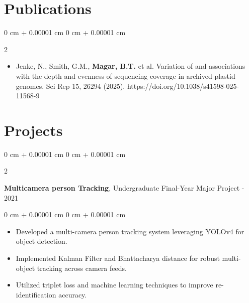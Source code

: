 \documentclass[10pt, letterpaper]{article}
\newenvironment{highlights}{
    \begin{itemize}[
        topsep=0.10 cm,
        parsep=0.10 cm,
        partopsep=0pt,
        itemsep=0.05cm,
        leftmargin=0 cm + 10pt
    ]
}{
    \end{itemize}
} %
\newenvironment{onecolentry}{
    \begin{adjustwidth}{
        0 cm + 0.00001 cm
    }{
        0 cm + 0.00001 cm
    }
}{
    \end{adjustwidth}
} %
\newenvironment{twocolentry}[2][]{
    \onecolentry
    \def\secondColumn{#2}
    \setcolumnwidth{\fill, 4.5 cm}
    \begin{paracol}{2}
}{
    \switchcolumn \raggedleft \secondColumn
    \end{paracol}
    \endonecolentry
} %
\begin{document}
\section{Publications}
\begin{twocolentry}
    {2025}
        \begin{highlights}
            \item Jenke, N., Smith, G.M., \textbf{Magar, B.T.} et al. Variation of and associations with the depth and evenness of sequencing coverage in archived plastid genomes. Sci Rep 15, 26294 (2025). https://doi.org/10.1038/s41598-025-11568-9
        \end{highlights}
\end{twocolentry}
    
    \section{Projects}



        
        \begin{twocolentry}{
            2019 - 2021
        }
            \textbf{Multicamera person Tracking}, Undergraduate Final-Year Major Project\end{twocolentry}

        \vspace{0.10 cm}
        \begin{onecolentry}
            \begin{highlights}
                \item Developed a multi-camera person tracking system leveraging YOLOv4 for object detection.
                \item Implemented Kalman Filter and Bhattacharya distance for robust multi-object tracking across camera feeds.
                \item Utilized triplet loss and machine learning techniques to improve re-identification accuracy.
            \end{highlights}
        \end{onecolentry}
\end{document}
